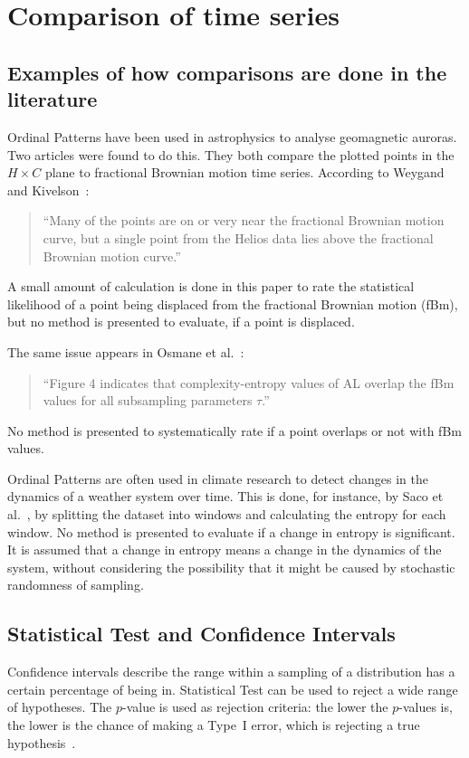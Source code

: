 \chapter{Comparison of time series}

\section{Examples of how comparisons are done in the literature}

Ordinal Patterns have been used in astrophysics to analyse geomagnetic auroras. 
Two articles were found to do this. 
They both compare the plotted points in the $H\times C$ plane to fractional Brownian motion time series. 
According to Weygand and Kivelson~\cite{Weygand2019}:
\begin{quote}
``Many of the points are on or very near the fractional Brownian motion curve, but a single point from the Helios data lies above the fractional Brownian motion curve.''
\end{quote}
A small amount of calculation is done in this paper to rate the statistical likelihood of a point being displaced from the fractional Brownian motion (fBm), but no method is presented to evaluate, if a point is displaced. 

The same issue appears in Osmane et al.~\cite{Osmane2019}:
\begin{quote}
``Figure 4 indicates that complexity-entropy values of AL overlap the fBm values for all subsampling parameters $\tau$.''
\end{quote}
No method is presented to systematically rate if a point overlaps or not with fBm values. 

Ordinal Patterns are often used in climate research to detect changes in the dynamics of a weather system over time. 
This is done, for instance, by Saco et al.~\cite{Saco2010}, by splitting the dataset into windows and calculating the entropy for each window. 
No method is presented to evaluate if a change in entropy is significant. 
It is assumed that a change in entropy means a change in the dynamics of the system, without considering the possibility that it might be caused by stochastic randomness of sampling. 

\section{Statistical Test and Confidence Intervals}

Confidence intervals describe the range within a sampling of a distribution has a certain percentage of being in. 
Statistical Test can be used to reject a wide range of hypotheses. 
The $p$-value is used as rejection criteria: the lower the $p$-values is, the lower is the chance of making a Type~I error, which is rejecting a true hypothesis~\cite{Smithson2003}.

